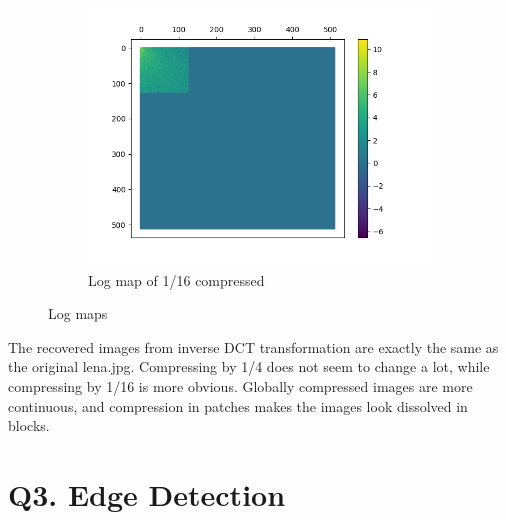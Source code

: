 \documentclass{article}
\begin{document}
\begin{figure}[htb!]
\begin{subfigure}[t]{0.3\textwidth}
			\includegraphics[width=\textwidth]{img/lena_compress_16_log_map.png}
			\caption{\label{fig:lena-log-16}Log map of 1/16 compressed}
		\end{subfigure}
		\hfill
		\caption{\label{fig:q1-2}Log maps}
	\end{figure}

	The recovered images from inverse DCT transformation are exactly the same as the original lena.jpg. Compressing by 1/4 does not seem to change a lot, while compressing by 1/16 is more obvious. Globally compressed images are more continuous, and compression in patches makes the images look dissolved in blocks.

\section*{Q3. Edge Detection}
\end{document}
